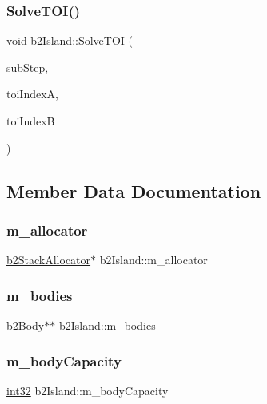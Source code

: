 \subsubsection{\texorpdfstring{SolveTOI()}{SolveTOI()}}
{\footnotesize\ttfamily void b2\+Island\+::\+Solve\+T\+OI (\begin{DoxyParamCaption}\item[{const \mbox{\hyperlink{structb2_time_step}{b2\+Time\+Step}} \&}]{sub\+Step,  }\item[{\mbox{\hyperlink{b2_settings_8h_a43d43196463bde49cb067f5c20ab8481}{int32}}}]{toi\+IndexA,  }\item[{\mbox{\hyperlink{b2_settings_8h_a43d43196463bde49cb067f5c20ab8481}{int32}}}]{toi\+IndexB }\end{DoxyParamCaption})}



\subsection{Member Data Documentation}
\mbox{\label{classb2_island_a5e28f216c0a12548c04491ab1d73c958}} 
\subsubsection{\texorpdfstring{m\_allocator}{m\_allocator}}
{\footnotesize\ttfamily \mbox{\hyperlink{classb2_stack_allocator}{b2\+Stack\+Allocator}}$\ast$ b2\+Island\+::m\+\_\+allocator}

\mbox{\label{classb2_island_ac9c65abf14c88e8a52fdd2c5cb56c5f4}} 
\subsubsection{\texorpdfstring{m\_bodies}{m\_bodies}}
{\footnotesize\ttfamily \mbox{\hyperlink{classb2_body}{b2\+Body}}$\ast$$\ast$ b2\+Island\+::m\+\_\+bodies}

\mbox{\label{classb2_island_a5ea371889bb93fb6387ff2ab427191ed}} 
\subsubsection{\texorpdfstring{m\_bodyCapacity}{m\_bodyCapacity}}
{\footnotesize\ttfamily \mbox{\hyperlink{b2_settings_8h_a43d43196463bde49cb067f5c20ab8481}{int32}} b2\+Island\+::m\+\_\+body\+Capacity}

